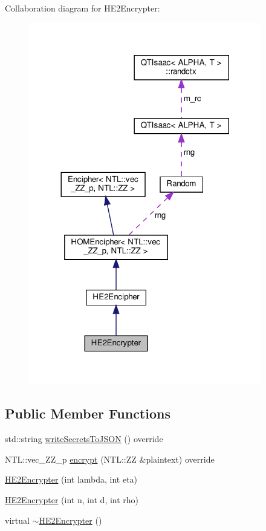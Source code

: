 Collaboration diagram for H\+E2\+Encrypter\+:
\nopagebreak
\begin{figure}[H]
\begin{center}
\leavevmode
\includegraphics[width=288pt]{classHE2Encrypter__coll__graph}
\end{center}
\end{figure}
\subsection*{Public Member Functions}
\begin{DoxyCompactItemize}
\item 
std\+::string \hyperlink{classHE2Encrypter_a8cdf863bfbe046b4e57322adf5addddb}{write\+Secrets\+To\+J\+S\+ON} () override
\item 
N\+T\+L\+::vec\+\_\+\+Z\+Z\+\_\+p \hyperlink{classHE2Encrypter_a57e4bdacbab9b11467f26deab921d134}{encrypt} (N\+T\+L\+::\+ZZ \&plaintext) override
\item 
\hyperlink{classHE2Encrypter_afa15786431e27f582fb4b62282407ed4}{H\+E2\+Encrypter} (int lambda, int eta)
\item 
\hyperlink{classHE2Encrypter_a38f4e27834ca8d2f2169dd8618e66650}{H\+E2\+Encrypter} (int n, int d, int rho)
\item 
virtual \hyperlink{classHE2Encrypter_a9f21f997f7d2cf93594613cd014a3b6d}{$\sim$\+H\+E2\+Encrypter} ()
\end{DoxyCompactItemize}
